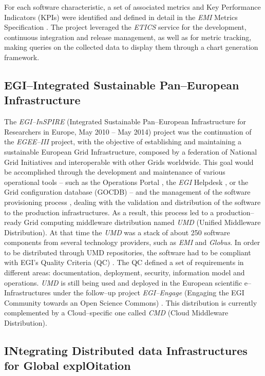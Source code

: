 \documentclass[journal]{IEEEtran}
\begin{document}
For each software characteristic, a set of associated
metrics and Key Performance Indicators (KPIs) were identified and defined in
detail in the {\sl EMI} Metrics Specification \cite{emi-quality-model}. The project
leveraged the {\sl ETICS} service for the development, continuous integration and release management,
as well as for metric tracking, making queries on the collected data to display
them through a chart generation framework.

\subsection{EGI--Integrated Sustainable Pan--European Infrastructure}

The {\sl EGI--InSPIRE} (Integrated Sustainable Pan--European Infrastructure for
Researchers in Europe, May 2010 -- May 2014) project \cite{cordis:egi-inspire}
was the continuation of the {\sl EGEE--III} project, with the objective of establishing and
maintaining a sustainable European Grid Infrastructure, composed by a federation of National
Grid Initiatives and interoperable with other Grids worldwide.
This goal would be accomplished through the
development and maintenance of various operational tools -- such as the Operations Portal \cite{egi-ops},
the {\sl EGI} Helpdesk \cite{ggus}, or the Grid configuration database (GOCDB) \cite{gocdb} -- and the
management of the software provisioning process \cite{mario}, dealing with the validation and distribution of the software to
the production infrastructures. As a result, this process led to a production--ready
Grid computing middleware distribution named {\sl UMD} (Unified Middleware Distribution). At that time the {\sl UMD}
was a stack of about 250 software components from several technology providers, such
as {\sl EMI} and {\sl Globus}. In order to be distributed through UMD
repositories, the software had to be compliant with EGI's Quality Criteria (QC) \cite{egi-qc}. The
QC defined a set of requirements in different areas: documentation, deployment, security, information
model and operations.
{\sl UMD} is still being used and
deployed in the European scientific e--Infrastructures under the follow--up
project {\sl EGI--Engage} (Engaging the EGI Community towards an Open Science
Commons) \cite{cordis:egi-engage}. This distribution is currently complemented
by a Cloud--specific one called {\sl CMD} (Cloud Middleware Distribution).

\subsection{INtegrating Distributed data Infrastructures for Global explOitation}
\end{document}
